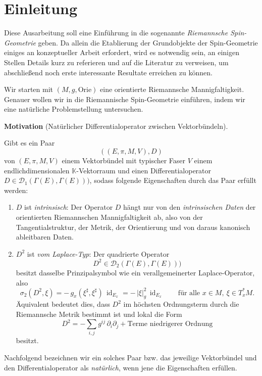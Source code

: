 \documentclass[10pt, letterpaper]{article}
\newcommand{\id}{\operatorname{id}}
\newcommand{\CustomHeading}[3]{%
  \par\medskip\noindent%
  \textbf{#1 #2} \textnormal{(#3)}.\enskip%
}
\newenvironment{MOT}[2]{\CustomHeading{Motivation}{#1}{#2}}{}
\begin{document}
\tableofcontents


\vspace{0.8cm}


\section{Einleitung}

Diese Ausarbeitung soll eine Einführung in die sogenannte \emph{Riemannsche Spin-Geometrie} geben. Da allein die Etablierung der Grundobjekte der Spin-Geometrie einiges an konzeptueller Arbeit erfordert, wird es notwendig sein, an einigen Stellen Details kurz zu referieren und auf die Literatur zu verweisen, um abschließend noch erste interessante Resultate erreichen zu können. 


Wir starten mit $(M,g,\text{Orie})$ eine orientierte Riemannsche Mannigfaltigkeit. Genauer wollen wir in die Riemannische Spin-Geometrie einführen, indem wir eine natürliche Problemstellung untersuchen.

\begin{MOT}{}{Natürlicher Differentialoperator zwischen Vektorbündeln}
  Gibt es ein Paar 
  $$\left( (E,\pi,M,V), D \right)$$
  von $(E,\pi,M,V)$ einem Vektorbündel mit typischer Faser $V$ einem endlichdimensionalen $\mathbb{K}$-Vektorraum und einen Differentialoperator $D\in \mathscr{D}_1(\Gamma(E),\Gamma(E)))$, sodass folgende Eigenschaften durch das Paar erfüllt werden:
  \begin{enumerate}
    \item $D$ ist \emph{intrinsisch}: Der Operator $D$ hängt nur von den \emph{intrinsischen Daten} der orientierten Riemannschen Mannigfaltigkeit ab, also von der Tangentialstruktur, der Metrik, der Orientierung und von daraus kanonisch ableitbaren Daten.

    \item $D^2$ ist \emph{vom Laplace-Typ}: Der quadrierte Operator
    \[
      D^2\in \mathscr{D}_2(\Gamma(E),\Gamma(E)))
    \]
    besitzt dasselbe Prinzipalsymbol wie ein verallgemeinerter Laplace-Operator, also
    \[
      \sigma_2(D^2,\xi)=-\,g_x(\xi^\sharp,\xi^\sharp)\,\id_{E_x}
      =-\,|\xi|_g^2\,\id_{E_x}
      \qquad
      \text{für alle }x\in M,\ \xi\in T_x^*M.
    \]
    Äquivalent bedeutet dies, dass $D^2$ im höchsten Ordnungsterm durch die Riemannsche Metrik bestimmt ist und lokal die Form
    {\color{blue}\[
      D^2=-\sum_{i,j} g^{ij}\,\partial_i\partial_j+\text{Terme niedrigerer Ordnung}
    \]}
    besitzt.
  \end{enumerate}
  Nachfolgend bezeichnen wir ein solches Paar bzw. das jeweilige Vektorbündel und den Differentialoperator als \emph{natürlich}, wenn jene die Eigenschaften erfüllen.
\end{MOT}
\end{document}
